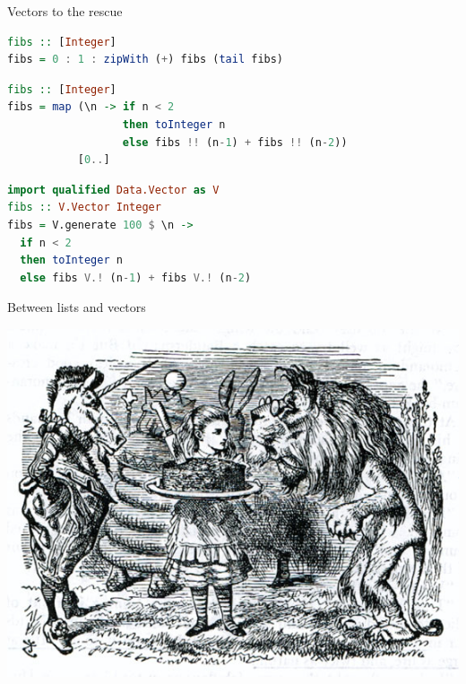 \documentclass[handout]{beamer}
\begin{document}
\begin{frame}[fragile]{Vectors to the rescue}

\begin{lstlisting}[language=Haskell]
fibs :: [Integer]
fibs = 0 : 1 : zipWith (+) fibs (tail fibs)
\end{lstlisting}

\begin{lstlisting}[language=Haskell]
fibs :: [Integer]
fibs = map (\n -> if n < 2
                  then toInteger n
                  else fibs !! (n-1) + fibs !! (n-2))
           [0..]
\end{lstlisting}

\begin{lstlisting}[language=Haskell]
import qualified Data.Vector as V
fibs :: V.Vector Integer
fibs = V.generate 100 $ \n ->
  if n < 2
  then toInteger n
  else fibs V.! (n-1) + fibs V.! (n-2)
\end{lstlisting}

\end{frame}

\begin{frame}[fragile]{Between lists and vectors}

  \includegraphics[width=1.03\textwidth]{lion-and-unicorn.png}

\end{frame}
\end{document}
